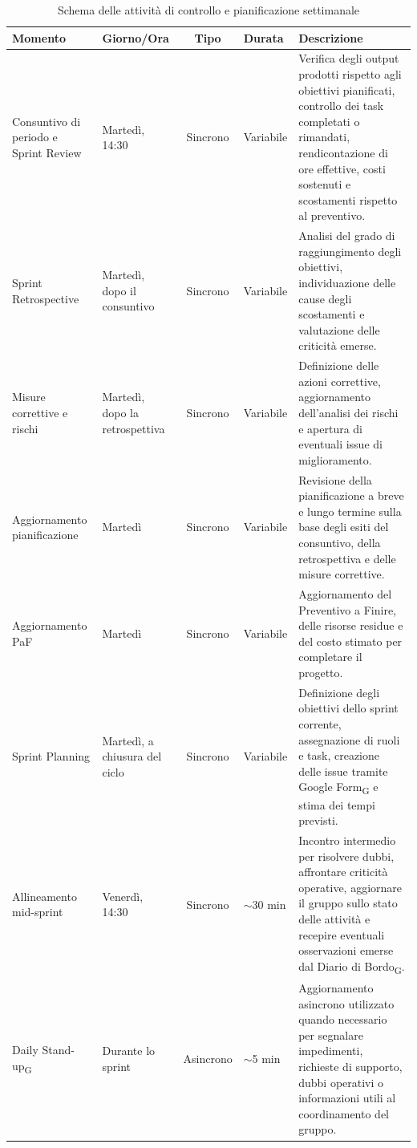\begin{table}[H]
\centering
\renewcommand{\arraystretch}{1.3}
\begin{tabularx}{\textwidth}{|p{2.8cm}|p{2.2cm}|c|p{2cm}|X|}
    \hline
    \textbf{Momento} & \textbf{Giorno/Ora} & \textbf{Tipo} &
    \textbf{Durata} & \textbf{Descrizione} \\
    \hline
    Consuntivo di periodo e Sprint Review
        & Martedì, 14:30 & Sincrono & Variabile
        & Verifica degli output prodotti rispetto agli obiettivi pianificati,
          controllo dei task completati o rimandati, rendicontazione di ore
          effettive, costi sostenuti e scostamenti rispetto al preventivo. \\
    \hline
    Sprint Retrospective
        & Martedì, dopo il consuntivo & Sincrono & Variabile
        & Analisi del grado di raggiungimento degli obiettivi, individuazione
          delle cause degli scostamenti e valutazione delle criticità emerse. \\
    \hline
    Misure correttive e rischi
        & Martedì, dopo la retrospettiva & Sincrono & Variabile
        & Definizione delle azioni correttive, aggiornamento dell'analisi dei
          rischi e apertura di eventuali issue di miglioramento. \\
    \hline
    Aggiornamento pianificazione
        & Martedì & Sincrono & Variabile
        & Revisione della pianificazione a breve e lungo termine sulla base degli
          esiti del consuntivo, della retrospettiva e delle misure correttive. \\
    \hline
    Aggiornamento PaF
        & Martedì & Sincrono & Variabile
        & Aggiornamento del Preventivo a Finire, delle risorse residue e del costo
          stimato per completare il progetto. \\
    \hline
    Sprint Planning
        & Martedì, a chiusura del ciclo & Sincrono & Variabile
        & Definizione degli obiettivi dello sprint corrente, assegnazione di ruoli
          e task, creazione delle issue tramite Google Form\textsubscript{G} e
          stima dei tempi previsti. \\
    \hline
    Allineamento mid-sprint
        & Venerdì, 14:30 & Sincrono & $\sim$30 min
        & Incontro intermedio per risolvere dubbi, affrontare criticità operative,
          aggiornare il gruppo sullo stato delle attività e recepire eventuali
          osservazioni emerse dal Diario di Bordo\textsubscript{G}. \\
    \hline
    Daily Stand-up\textsubscript{G}
        & Durante lo sprint & Asincrono & $\sim$5 min
        & Aggiornamento asincrono utilizzato quando necessario per segnalare
          impedimenti, richieste di supporto, dubbi operativi o informazioni
          utili al coordinamento del gruppo. \\
    \hline
\end{tabularx}
\caption{Schema delle attività di controllo e pianificazione settimanale}
\end{table}

